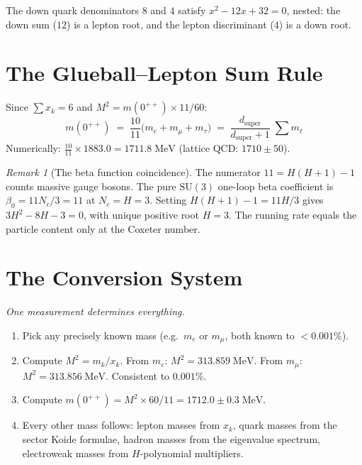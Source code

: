 \documentclass[11pt,a4paper]{article}
\theoremstyle{definition}
\theoremstyle{remark}
\newtheorem{remark}[theorem]{Remark}
\newcommand{\SU}{\mathrm{SU}}
\begin{document}
\medskip

The down quark denominators $8$ and $4$ satisfy $x^2 - 12x + 32 = 0$, nested: the down sum ($12$) is a lepton root, and the lepton discriminant ($4$) is a down root.

\section*{The Glueball--Lepton Sum Rule}

Since $\sum x_k = 6$ and $M^2 = m(0^{++})\times 11/60$:
\begin{equation}\label{eq:sum_rule}
\boxed{\;m(0^{++}) \;=\; \frac{10}{11}\bigl(m_e + m_\mu + m_\tau\bigr) \;=\; \frac{d_\mathrm{super}}{d_\mathrm{super}+1}\;\sum m_\ell\;}
\end{equation}
Numerically: $\frac{10}{11}\times 1883.0 = 1711.8\;\mathrm{MeV}$ (lattice QCD: $1710\pm 50$).

\begin{remark}[The beta function coincidence]
The numerator $11 = H(H\!+\!1)-1$ counts massive gauge bosons. The pure $\SU(3)$ one-loop beta coefficient is $\beta_0 = 11N_c/3 = 11$ at $N_c = H = 3$. Setting $H(H\!+\!1)-1 = 11H/3$ gives $3H^2 - 8H - 3 = 0$, with unique positive root $H = 3$. The running rate equals the particle content only at the Coxeter number.
\end{remark}

\section*{The Conversion System}

\emph{One measurement determines everything.}

\begin{enumerate}[nosep]
\item Pick any precisely known mass (e.g.\ $m_e$ or $m_\mu$, both known to $<0.001\%$).
\item Compute $M^2 = m_k/x_k$. From $m_e$: $M^2 = 313.859\;\mathrm{MeV}$. From $m_\mu$: $M^2 = 313.856\;\mathrm{MeV}$. Consistent to $0.001\%$.
\item Compute $m(0^{++}) = M^2\times 60/11 = 1712.0\pm 0.3\;\mathrm{MeV}$.
\item Every other mass follows: lepton masses from $x_k$, quark masses from the sector Koide formulae, hadron masses from the eigenvalue spectrum, electroweak masses from $H$-polynomial multipliers.
\end{enumerate}
\end{document}
